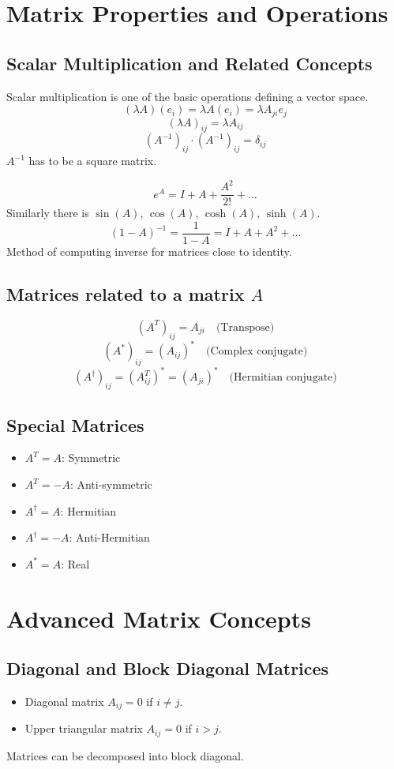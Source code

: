 \documentclass[11pt, a4paper]{report}
\begin{document}
\section{Matrix Properties and Operations}

\subsection{Scalar Multiplication and Related Concepts}
Scalar multiplication is one of the basic operations defining a vector space.
$$
(\lambda A)(e_i) = \lambda A(e_i) = \lambda A_{ji} e_j
$$
$$
(\lambda A)_{ij} = \lambda A_{ij}
$$
$$
(A^{-1})_{ij} \cdot (A^{-1})_{ij} = \delta_{ij}
$$
$A^{-1}$ has to be a square matrix.

$$
e^A = I + A + \frac{A^2}{2!} + \dots
$$
Similarly there is $\sin(A)$, $\cos(A)$, $\cosh(A)$, $\sinh(A)$.
$$
(1-A)^{-1} = \frac{1}{1-A} = I + A + A^2 + \dots
$$
Method of computing inverse for matrices close to identity.

\subsection{Matrices related to a matrix $A$}
$$
(A^T)_{ij} = A_{ji} \quad \text{(Transpose)}
$$
$$
(A^\ast)_{ij} = (A_{ij})^\ast \quad \text{(Complex conjugate)}
$$
$$
(A^\dagger)_{ij} = (A^T_{ij})^\ast = (A_{ji})^\ast \quad \text{(Hermitian conjugate)}
$$

\subsection{Special Matrices}
\begin{itemize}
    \item $A^T=A$: Symmetric
    \item $A^T=-A$: Anti-symmetric
    \item $A^\dagger=A$: Hermitian
    \item $A^\dagger=-A$: Anti-Hermitian
    \item $A^\ast=A$: Real
\end{itemize}

\section{Advanced Matrix Concepts}

\subsection{Diagonal and Block Diagonal Matrices}
\begin{itemize}
    \item Diagonal matrix $A_{ij}=0$ if $i \ne j$.
    \item Upper triangular matrix $A_{ij}=0$ if $i>j$.
\end{itemize}
Matrices can be decomposed into block diagonal.
\end{document}

